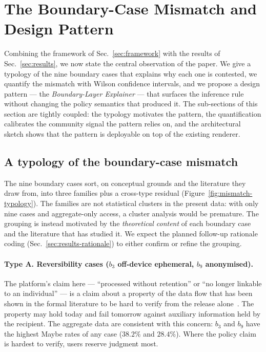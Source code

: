 \documentclass[11pt,a4paper]{article}
\makeatletter
\let\@oldsection\section
\renewcommand{\section}{\FloatBarrier\@oldsection}
\makeatother
\begin{document}
\section{The Boundary-Case Mismatch and Design Pattern}\label{sec:mismatch}

Combining the framework of Sec.~\ref{sec:framework} with the results
of Sec.~\ref{sec:results}, we now state the central observation of
the paper. We give a typology of the nine boundary cases that
explains why each one is contested, we quantify the mismatch with
Wilson confidence intervals, and we propose a design pattern --- the
\emph{Boundary-Layer Explainer} --- that surfaces the inference rule
without changing the policy semantics that produced it. The
sub-sections of this section are tightly coupled: the typology
motivates the pattern, the quantification calibrates the community
signal the pattern relies on, and the architectural sketch shows
that the pattern is deployable on top of the existing renderer.

\subsection{A typology of the boundary-case mismatch}\label{sec:typology}

The nine boundary cases sort, on conceptual grounds and the
literature they draw from, into three families plus a cross-type
residual (Figure~\ref{fig:mismatch-typology}). The families are
not statistical clusters in the present data: with only nine cases
and aggregate-only access, a cluster analysis would be premature.
The grouping is instead motivated by the \emph{theoretical content}
of each boundary case and the literature that has studied it. We
expect the planned follow-up rationale coding
(Sec.~\ref{sec:results-rationale}) to either confirm or refine the
grouping.

\paragraph{Type A. Reversibility cases ($b_3$ off-device ephemeral,
$b_9$ anonymised).}
The platform's claim here --- ``processed without retention'' or
``no longer linkable to an individual'' --- is a claim about a
property of the data flow that has been shown in the formal
literature to be hard to verify from the
release alone~\citep{dwork:roth:2014,nissim:wood:2018}. The
property may hold today and fail tomorrow against auxiliary
information held by the recipient. The aggregate data are
consistent with this concern: $b_3$ and $b_9$ have the highest
Maybe rates of any case ($38.2\%$ and $28.4\%$). Where the policy
claim is hardest to verify, users reserve judgment most.
\end{document}
